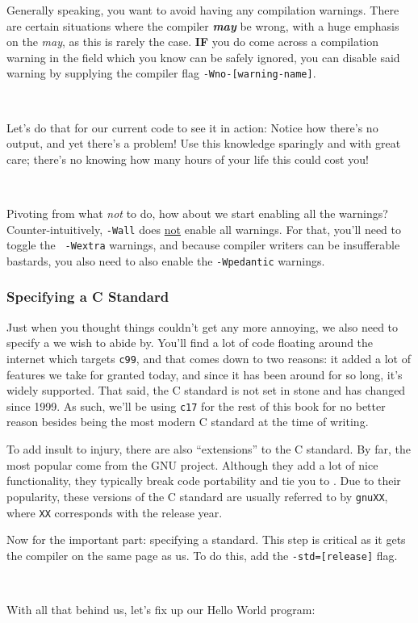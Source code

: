 Generally speaking, you want to avoid having any compilation warnings.
There are certain situations where the compiler \textbf{\emph{may}} be
wrong, with a huge emphasis on the \emph{may}, as this is rarely the
case.  \textbf{IF} you do come across a compilation warning in the field
which you know can be safely ignored, you can disable said warning by
supplying the compiler flag \texttt{-Wno-[warning-name]}.

\

\noindent
Let's do that for our current code to see it in action:
\noindent
Notice how there's no output, and yet there's a problem!  Use this
knowledge sparingly and with great care; there's no knowing how many
hours of your life this could cost you!

\

\noindent
Pivoting from what \emph{not} to do, how about we start enabling all the
warnings?  Counter-intuitively, \texttt{-Wall} does \underline{not}
enable all warnings.  For that, you'll need to toggle the \texttt{%
-Wextra} warnings, and because compiler writers can be insufferable
bastards, you also need to also enable the \texttt{-Wpedantic} warnings.

\subsubsection{Specifying a C Standard}

Just when you thought things couldn't get any more annoying, we also
need to specify a  we wish to abide by.  You'll find a
lot of code floating around the internet which targets \texttt{c99}, and
that comes down to two reasons: it added a lot of features we take for
granted today, and since it has been around for so long, it's widely
supported.  That said, the C standard is not set in stone and has
changed since 1999.  As such, we'll be using \texttt{c17} for the rest
of this book for no better reason besides being the most modern C
standard at the time of writing.

To add insult to injury, there are also \enquote{extensions} to the C
standard.  By far, the most popular come from the GNU project.  Although
they add a lot of nice functionality, they typically break code
portability and tie you to .  Due to their popularity,
these versions of the C standard are usually referred to by
\texttt{gnuXX}, where \texttt{XX} corresponds with the release year.

Now for the important part: specifying a standard.  This step is
critical as it gets the compiler on the same page as us.  To do this,
add the \texttt{-std=[release]} flag.

\

\noindent
With all that behind us, let's fix up our Hello World program:
